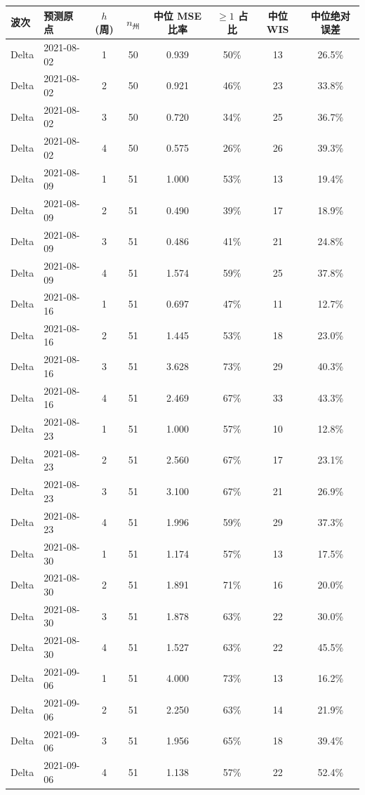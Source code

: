 \begin{tabular}{llcccccc}
\toprule
波次 & 预测原点 & $h$ (周) & $n_{\text{州}}$ & 中位 MSE 比率 & $\ge 1$ 占比 & 中位 WIS & 中位绝对误差 \\
\midrule
Delta & 2021-08-02 & 1 & 50 & 0.939 & 50\% & 13 & 26.5\% \\
Delta & 2021-08-02 & 2 & 50 & 0.921 & 46\% & 23 & 33.8\% \\
Delta & 2021-08-02 & 3 & 50 & 0.720 & 34\% & 25 & 36.7\% \\
Delta & 2021-08-02 & 4 & 50 & 0.575 & 26\% & 26 & 39.3\% \\
Delta & 2021-08-09 & 1 & 51 & 1.000 & 53\% & 13 & 19.4\% \\
Delta & 2021-08-09 & 2 & 51 & 0.490 & 39\% & 17 & 18.9\% \\
Delta & 2021-08-09 & 3 & 51 & 0.486 & 41\% & 21 & 24.8\% \\
Delta & 2021-08-09 & 4 & 51 & 1.574 & 59\% & 25 & 37.8\% \\
Delta & 2021-08-16 & 1 & 51 & 0.697 & 47\% & 11 & 12.7\% \\
Delta & 2021-08-16 & 2 & 51 & 1.445 & 53\% & 18 & 23.0\% \\
Delta & 2021-08-16 & 3 & 51 & 3.628 & 73\% & 29 & 40.3\% \\
Delta & 2021-08-16 & 4 & 51 & 2.469 & 67\% & 33 & 43.3\% \\
Delta & 2021-08-23 & 1 & 51 & 1.000 & 57\% & 10 & 12.8\% \\
Delta & 2021-08-23 & 2 & 51 & 2.560 & 67\% & 17 & 23.1\% \\
Delta & 2021-08-23 & 3 & 51 & 3.100 & 67\% & 21 & 26.9\% \\
Delta & 2021-08-23 & 4 & 51 & 1.996 & 59\% & 29 & 37.3\% \\
Delta & 2021-08-30 & 1 & 51 & 1.174 & 57\% & 13 & 17.5\% \\
Delta & 2021-08-30 & 2 & 51 & 1.891 & 71\% & 16 & 20.0\% \\
Delta & 2021-08-30 & 3 & 51 & 1.878 & 63\% & 22 & 30.0\% \\
Delta & 2021-08-30 & 4 & 51 & 1.527 & 63\% & 22 & 45.5\% \\
Delta & 2021-09-06 & 1 & 51 & 4.000 & 73\% & 13 & 16.2\% \\
Delta & 2021-09-06 & 2 & 51 & 2.250 & 63\% & 14 & 21.9\% \\
Delta & 2021-09-06 & 3 & 51 & 1.956 & 65\% & 18 & 39.4\% \\
Delta & 2021-09-06 & 4 & 51 & 1.138 & 57\% & 22 & 52.4\% \\

\end{tabular}
